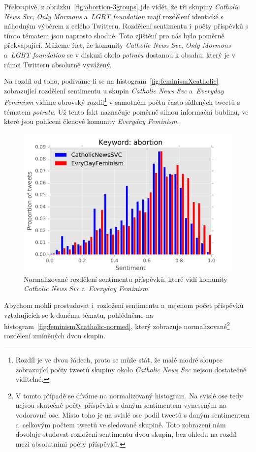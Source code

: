 \documentclass[12pt, a4paper]{article}
\numberwithin{equation}{section} 	%
\begin{document}
Překvapivě, z obrázku~\autoref{fig:abortion-3groups} jde vidět, že tři skupiny \textit{Catholic News Svc}, \textit{Only Mormons} a~\textit{LGBT foundation} mají rozdělení identické s náhodným výběrem z celého Twitteru. Rozdělení sentimentu i~počty příspěvků s tímto tématem jsou naprosto shodné. Toto zjištění pro nás bylo poměrně překvapující. Můžeme říct, že komunity \textit{Catholic News Svc}, \textit{Only Mormons} a~\textit{LGBT foundation} se v diskuzi okolo \textit{potratu} dostanou k obsahu, který je v rámci Twitteru absolutně vyvážený.

Na rozdíl od toho, podíváme-li se na histogram~\autoref{fig:feminismXcatholic} zobrazující rozdělení sentimentu u skupin \textit{Catholic News Svc} a~\textit{Everyday Feminism} vidíme obrovský rozdíl\footnote{Rozdíl je ve dvou řádech, proto se může stát, že malé modré sloupce zobrazující počty tweetů skupiny okolo \textit{Catholic News Svc} nejsou dostatečně viditelné.} v samotném počtu často sídlených tweetů s tématem \textit{potratu}. Už tento fakt naznačuje poměrně silnou informační bublinu, ve které jsou pohlceni členové komunity \textit{Everyday Feminism}.
\begin{figure}[h]
\centering
\includegraphics[scale=0.5]{./Pics/feminismXcatholic-normed.png}
\caption{Normalizované rozdělení sentimentu příspěvků, které vidí komunity \textit{Catholic News Svc} a~\textit{Everyday Feminism}.}
\label{fig:feminismXcatholic-normed}
\end{figure}
Abychom mohli prostudovat i~rozložení sentimentu a~nejenom počet příspěvků vztahujících se k danému tématu, pohlédněme na histogram~\autoref{fig:feminismXcatholic-normed}, který zobrazuje normalizované\footnote{V tomto případě se díváme na normalizovaný histogram. Na svislé ose tedy nejsou skutečné počty příspěvků s daným sentimentem vyneseným na vodorovné ose. Místo toho je na svislé ose podíl tweetů s daným sentimentem a~celkovým počtem tweetů ve sledované skupině. Toto zobrazení nám dovoluje studovat rozložení sentimentu dvou skupin, bez ohledu na rozdíl mezi absolutními počty příspěvků.} rozdělení zmíněných dvou skupin.
\end{document}
